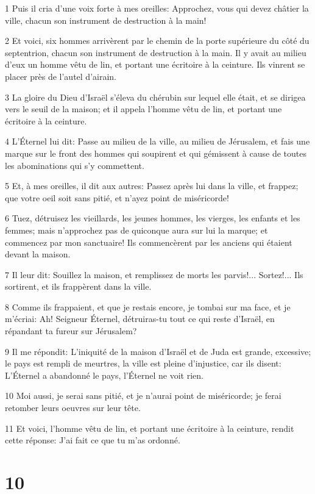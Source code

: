 \par 1 Puis il cria d'une voix forte à mes oreilles: Approchez, vous qui devez châtier la ville, chacun son instrument de destruction à la main!
\par 2 Et voici, six hommes arrivèrent par le chemin de la porte supérieure du côté du septentrion, chacun son instrument de destruction à la main. Il y avait au milieu d'eux un homme vêtu de lin, et portant une écritoire à la ceinture. Ils vinrent se placer près de l'autel d'airain.
\par 3 La gloire du Dieu d'Israël s'éleva du chérubin sur lequel elle était, et se dirigea vers le seuil de la maison; et il appela l'homme vêtu de lin, et portant une écritoire à la ceinture.
\par 4 L'Éternel lui dit: Passe au milieu de la ville, au milieu de Jérusalem, et fais une marque sur le front des hommes qui soupirent et qui gémissent à cause de toutes les abominations qui s'y commettent.
\par 5 Et, à mes oreilles, il dit aux autres: Passez après lui dans la ville, et frappez; que votre oeil soit sans pitié, et n'ayez point de miséricorde!
\par 6 Tuez, détruisez les vieillards, les jeunes hommes, les vierges, les enfants et les femmes; mais n'approchez pas de quiconque aura sur lui la marque; et commencez par mon sanctuaire! Ils commencèrent par les anciens qui étaient devant la maison.
\par 7 Il leur dit: Souillez la maison, et remplissez de morts les parvis!... Sortez!... Ils sortirent, et ils frappèrent dans la ville.
\par 8 Comme ils frappaient, et que je restais encore, je tombai sur ma face, et je m'écriai: Ah! Seigneur Éternel, détruiras-tu tout ce qui reste d'Israël, en répandant ta fureur sur Jérusalem?
\par 9 Il me répondit: L'iniquité de la maison d'Israël et de Juda est grande, excessive; le pays est rempli de meurtres, la ville est pleine d'injustice, car ils disent: L'Éternel a abandonné le pays, l'Éternel ne voit rien.
\par 10 Moi aussi, je serai sans pitié, et je n'aurai point de miséricorde; je ferai retomber leurs oeuvres sur leur tête.
\par 11 Et voici, l'homme vêtu de lin, et portant une écritoire à la ceinture, rendit cette réponse: J'ai fait ce que tu m'as ordonné.

\chapter{10}

